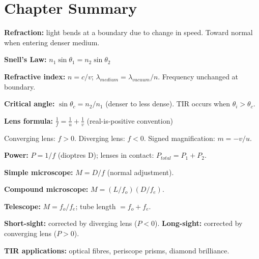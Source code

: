 \section{Chapter Summary}

\begin{summarybox}
\textbf{Refraction:} light bends at a boundary due
to change in speed.
Toward normal when entering denser medium.

\textbf{Snell's Law:}
$n_1\sin\theta_1 = n_2\sin\theta_2$

\textbf{Refractive index:} $n = c/v$;
$\lambda_{medium} = \lambda_{vacuum}/n$.
Frequency unchanged at boundary.

\textbf{Critical angle:}
$\sin\theta_c = n_2/n_1$ (denser to less dense).
TIR occurs when $\theta_i > \theta_c$.

\textbf{Lens formula:}
$\frac{1}{f} = \frac{1}{u} + \frac{1}{v}$
(real-is-positive convention)

Converging lens: $f > 0$.
Diverging lens: $f < 0$.
Signed magnification: $m = -v/u$.

\textbf{Power:} $P = 1/f$ (dioptres D);
lenses in contact: $P_{total} = P_1 + P_2$.

\textbf{Simple microscope:}
$M = D/f$ (normal adjustment).

\textbf{Compound microscope:}
$M = (L/f_o)(D/f_e)$.

\textbf{Telescope:}
$M = f_o/f_e$; tube length $= f_o + f_e$.

\textbf{Short-sight:} corrected by diverging lens
($P < 0$). \textbf{Long-sight:} corrected by
converging lens ($P > 0$).

\textbf{TIR applications:} optical fibres,
periscope prisms, diamond brilliance.
\end{summarybox}

